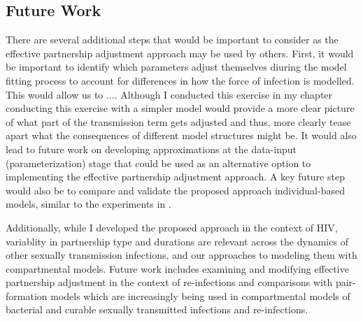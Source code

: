 \subsection{Future Work}\label{foi.disc.fw}
There are several additional steps that would be important to consider as the effective partnership
adjustment approach may be used by others. First, it would be important to identify which parameters adjust
themselves diuring the model fitting process to account for differences in how the force of infection is modelled. 
This would allow us to .... 
Although I conducted this exercise in my chapter %
conducting this exercise with a simpler model would provide a more clear picture of what part of the transmission term gets adjusted and thus,  %
more clearly tease apart what the consequences of different model structures might be. It would also lead to future work 
on developing approximations at the data-input (parameterization) stage that could be used as an alternative option to implementing the 
effective partnership adjustment approach. 
A key future step would also be to compare and  validate the proposed approach \vs individual-based models, %
similar to the experiments in \cite{Johnson2016mf}.
\par
Additionally, while I developed the proposed approach in the context of HIV,
variablity in partnership type and durations are relevant across the dynamics of other 
sexually transmission infections, and our approaches to modeling them with compartmental models. 
Future work includes examining and modifying effective partnership adjustment in the context of re-infections
and comparisons with pair-formation models which are increasingly being used in compartmental models of 
bacterial and curable sexually transmitted infections and re-infections.

